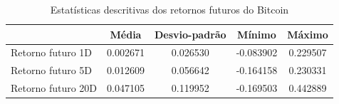 \begin{table}
\caption{Estatísticas descritivas dos retornos futuros do Bitcoin}
\label{tab:estatisticas_retornos_futuros}
\begin{tabular}{lcccc}
\toprule
 & Média & Desvio-padrão & Mínimo & Máximo \\
\midrule
Retorno futuro 1D & 0.002671 & 0.026530 & -0.083902 & 0.229507 \\
Retorno futuro 5D & 0.012609 & 0.056642 & -0.164158 & 0.230331 \\
Retorno futuro 20D & 0.047105 & 0.119952 & -0.169503 & 0.442889 \\
\bottomrule
\end{tabular}
\end{table}
